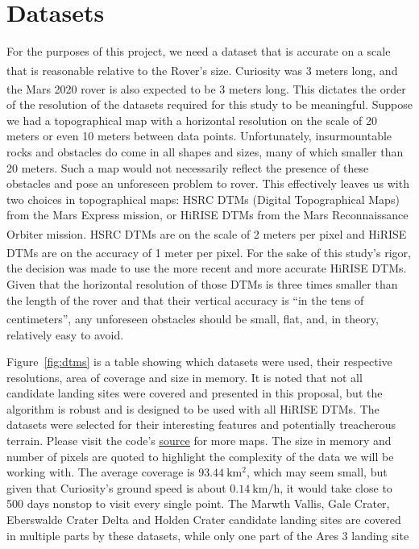 \documentclass[12pt]{article}
\newcommand{\supcite}[1]{\textsuperscript{\cite{#1}}}
\begin{document}
\section{Datasets}
\label{sec:datasets}
\par For the purposes of this project, we need a dataset that is accurate on a scale that is reasonable relative to the Rover's size. Curiosity was 3 meters long\supcite{bib:curiosity}, and the Mars 2020 rover is also expected to be 3 meters long\supcite{bib:rover2020}. This dictates the order of the resolution of the datasets required for this study to be meaningful. Suppose we had a topographical map with a horizontal resolution on the scale of 20 meters or even 10 meters between data points. Unfortunately, insurmountable rocks and obstacles do come in all shapes and sizes, many of which smaller than 20 meters. Such a map would not necessarily reflect the presence of these obstacles and pose an unforeseen problem to rover. This effectively leaves us with two choices in topographical maps: HSRC DTMs (Digital Topographical Maps) from the Mars Express mission, or HiRISE DTMs from the Mars Reconnaissance Orbiter mission. HSRC DTMs are on the scale of 2 meters per pixel\supcite{bib:hsrc} and HiRISE DTMs are on the accuracy of 1 meter per pixel\supcite{bib:abouthirise}. For the sake of this study's rigor, the decision was made to use the more recent and more accurate HiRISE DTMs. Given that the horizontal resolution of those DTMs is three times smaller than the length of the rover and that their vertical accuracy is ``in the tens of centimeters''\supcite{bib:abouthirise}, any unforeseen obstacles should be small, flat, and, in theory, relatively easy to avoid.
\par Figure~\ref{fig:dtms} is a table showing which datasets were used, their respective resolutions, area of coverage and size in memory. It is noted that not all candidate landing sites were covered and presented in this proposal, but the algorithm is robust and is designed to be used with all HiRISE DTMs. The datasets were selected for their interesting features and potentially treacherous terrain. Please visit the code's \href{https://github.com/PapaCharlie/Rover-Climb-Angles/tree/master/figures}{\ttfamily\color{blue} \underline{source}} for more maps. The size in memory and number of pixels are quoted to highlight the complexity of the data we will be working with. The average coverage is $\SI{93.44}{\kilo\meter\squared}$, which may seem small, but given that Curiosity's ground speed is about $\SI{0.14}{\kilo\meter\per\hour}$, it would take close to 500 days nonstop to visit every single point. The Marwth Vallis, Gale Crater, Eberswalde Crater Delta and Holden Crater candidate landing sites are covered in multiple parts by these datasets, while only one part of the Ares 3 landing site
\end{document}
